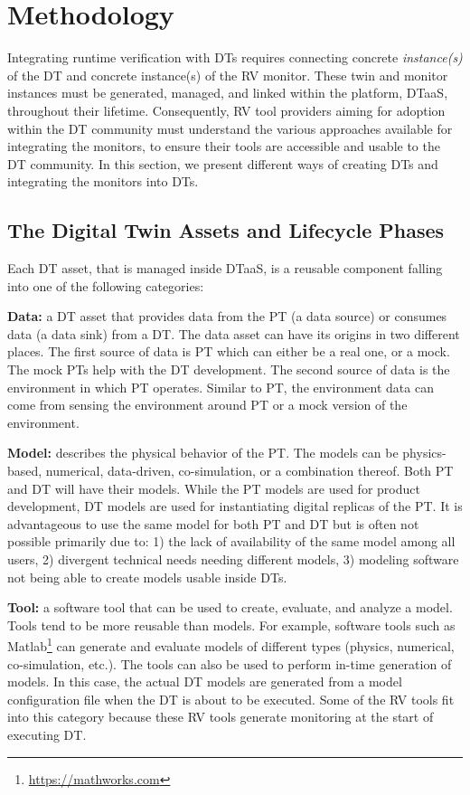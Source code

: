 \section{Methodology}\label{sec:methodology}
Integrating runtime verification with DTs requires connecting concrete \emph{instance(s)} of the DT and concrete instance(s) of the RV monitor.
These twin and monitor instances must be generated, managed, and linked within the platform, DTaaS, throughout their lifetime.
Consequently, RV tool providers aiming for adoption within the DT community must understand the various approaches available for integrating the monitors, to ensure their tools are accessible and usable to the DT community.
In this section, we present different ways of creating DTs and integrating the monitors into DTs.


\subsection{The Digital Twin Assets and Lifecycle Phases}
\label{sec:dt-integration}

Each DT asset, that is managed inside DTaaS, is a reusable component falling into one of the following categories:

\textbf{Data:} a DT asset that provides data from the PT (a data source) or consumes data (a data sink) from a DT. The data asset can have its origins in two different places. The first source of data is PT which can either be a real one, or a mock. The mock PTs help with the DT development. The second source of data is the environment in which PT operates. Similar to PT, the environment data can come from sensing the environment around PT or a mock version of the environment.

\textbf{Model:} describes the physical behavior of the PT. The models can be physics-based, numerical, data-driven, co-simulation, or a combination thereof. Both PT and DT will have their models. While the PT models are used for product development, DT models are used for instantiating digital replicas of the PT. It is advantageous to use the same model for both PT and DT but is often not possible primarily due to: 1) the lack of availability of the same model among all users, 2) divergent technical needs needing different models, 3) modeling software not being able to create models usable inside DTs.

\textbf{Tool:} a software tool that can be used to create, evaluate, and analyze a model. Tools tend to be more reusable than models. For example, software tools such as Matlab\footnote{\url{https://mathworks.com}} can generate and evaluate models of different types (physics, numerical, co-simulation, etc.). The tools can also be used to perform in-time generation of models. In this case, the actual DT models are generated from a model configuration file when the DT is about to be executed. Some of the RV tools fit into this category because these RV tools generate monitoring at the start of executing DT.

